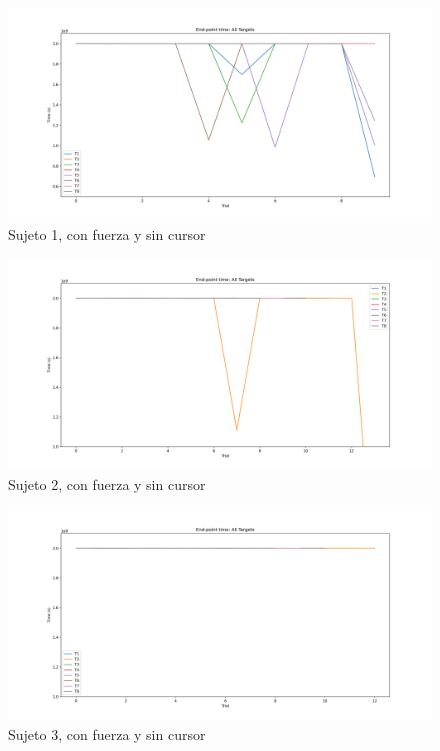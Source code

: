 \documentclass[a4paper,11pt, oneside]{book}
\begin{document}
\begin{figure}[H]
	\includegraphics[width=\linewidth]{sujeto1/force_no_cursor/evolution_time}
	\caption{Sujeto 1, con  fuerza y sin cursor}
	\label{1-4-3}
\end{figure}
\begin{figure}[H]
	\includegraphics[width=\linewidth]{sujeto2/force_no_cursor/evolution_time}
	\caption{Sujeto 2, con  fuerza y sin cursor}
	\label{2-4-3}
\end{figure}
\begin{figure}[H]
	\includegraphics[width=\linewidth]{sujeto3/force_no_cursor/evolution_time}
	\caption{Sujeto 3, con  fuerza y sin cursor}
	\label{3-4-3}
\end{figure}
\end{document}
